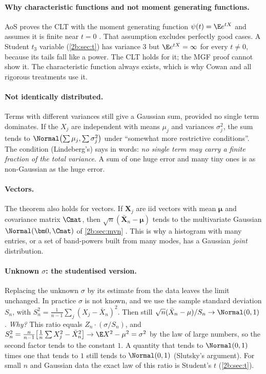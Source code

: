 \paragraph{Why characteristic functions and not moment generating functions.}
AoS proves the CLT with the moment generating function $\psi(t)=\E e^{tX}$ and assumes it is finite near $t=0$ . That assumption excludes perfectly good cases. A Student $t_3$ variable (\cref{2b:sec:t}) has variance $3$ but $\E e^{tX}=\infty$ for every $t\ne0$, because its tails fall like a power. The CLT holds for it; the MGF proof cannot show it. The characteristic function always exists, which is why Cowan and all rigorous treatments use it.

\paragraph{Not identically distributed.} Terms with different variances still give a Gaussian sum, provided no single term dominates. If the $X_j$ are independent with means $\mu_j$ and variances $\sigma_j^2$, the sum tends to $\Normal\bigl(\sum\mu_j,\sum\sigma_j^2\bigr)$  under ``somewhat more restrictive conditions''. The condition (Lindeberg's) says in words: \emph{no single term may carry a finite fraction of the total variance}. A sum of one huge error and many tiny ones is as non-Gaussian as the huge error.

\paragraph{Vectors.} The theorem also holds for vectors. If $\bm X_j$ are iid vectors with mean $\bm\mu$ and covariance matrix $\Cmat$, then $\sqrt n(\bar{\bm X}_n-\bm\mu)$ tends to the multivariate Gaussian $\Normal(\bm 0,\Cmat)$ of \cref{2b:sec:mvn} . This is why a histogram with many entries, or a set of band-powers built from many modes, has a Gaussian \emph{joint} distribution.

\paragraph{Unknown $\sigma$: the studentised version.} Replacing the unknown $\sigma$ by its estimate from the data leaves the limit unchanged. In practice $\sigma$ is not known, and we use the sample standard deviation $S_n$, with $S_n^2=\frac1{n-1}\sum_j(X_j-\bar X_n)^2$. Then still $\sqrt n(\bar X_n-\mu)/S_n\to\Normal(0,1)$ . \emph{Why?} This ratio equals $Z_n\cdot(\sigma/S_n)$, and $S_n^2=\frac{n}{n-1}\bigl[\frac1n\sum X_j^2-\bar X_n^2\bigr]\to\E X^2-\mu^2=\sigma^2$ by the law of large numbers, so the second factor tends to the constant $1$. A quantity that tends to $\Normal(0,1)$ times one that tends to $1$ still tends to $\Normal(0,1)$ (Slutsky's argument). For small $n$ and Gaussian data the exact law of this ratio is Student's $t$ (\cref{2b:sec:t}).

